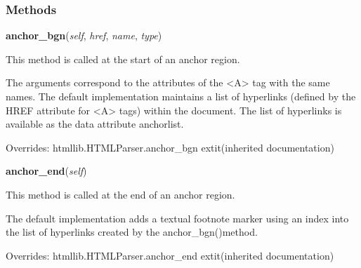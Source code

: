 
  \subsubsection{Methods}

    \vspace{0.5ex}

\hspace{.8\funcindent}\begin{boxedminipage}{\funcwidth}

    \raggedright \textbf{anchor\_bgn}(\textit{self}, \textit{href}, \textit{name}, \textit{type})

\setlength{\parskip}{2ex}
    This method is called at the start of an anchor region.

    The arguments correspond to the attributes of the 
    {\textless}A{\textgreater} tag with the same names.  The default 
    implementation maintains a list of hyperlinks (defined by the HREF 
    attribute for {\textless}A{\textgreater} tags) within the document.  
    The list of hyperlinks is available as the data attribute anchorlist.

\setlength{\parskip}{1ex}
      Overrides: htmllib.HTMLParser.anchor\_bgn 	extit{(inherited documentation)}

    \end{boxedminipage}

    \vspace{0.5ex}

\hspace{.8\funcindent}\begin{boxedminipage}{\funcwidth}

    \raggedright \textbf{anchor\_end}(\textit{self})

\setlength{\parskip}{2ex}
    This method is called at the end of an anchor region.

    The default implementation adds a textual footnote marker using an 
    index into the list of hyperlinks created by the anchor\_bgn()method.

\setlength{\parskip}{1ex}
      Overrides: htmllib.HTMLParser.anchor\_end 	extit{(inherited documentation)}

    \end{boxedminipage}


